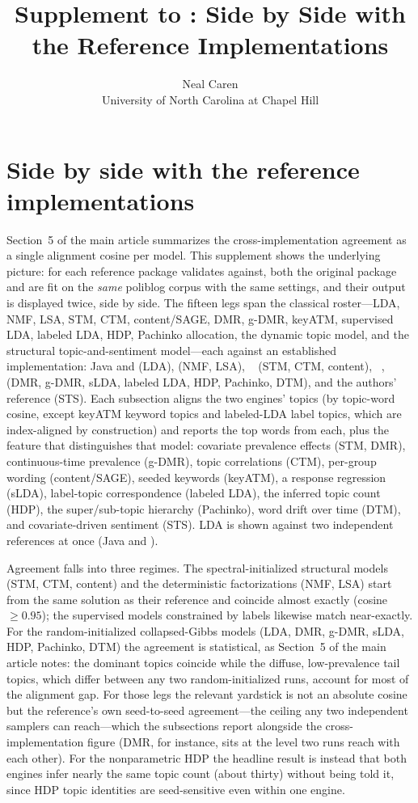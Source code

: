 \documentclass[article,nojss]{jss}
\author{Neal Caren\\University of North Carolina at Chapel Hill}
\title{Supplement to \pkg{topica}: Side by Side with the Reference
Implementations}
\begin{document}
\section{Side by side with the reference implementations}\label{app:sidebyside}

Section~5 of the main article summarizes the cross-implementation agreement as a
single alignment cosine per model. This supplement shows the underlying picture: for
each reference package  validates against, both the original package
and  are fit on the \emph{same} poliblog corpus with the same
settings, and their output is displayed twice, side by side. The fifteen legs span
the classical roster---LDA, NMF, LSA, STM, CTM, content/SAGE, DMR, g-DMR, keyATM,
supervised LDA, labeled LDA, HDP, Pachinko allocation, the dynamic topic model, and
the structural topic-and-sentiment model---each against an established
implementation: Java  and  (LDA),  (NMF,
LSA), ~ (STM, CTM, content), ~,
 (DMR, g-DMR, sLDA, labeled LDA, HDP, Pachinko, DTM), and the authors'
 reference (STS). Each subsection aligns the two engines' topics (by
topic-word cosine, except keyATM keyword topics and labeled-LDA label topics, which
are index-aligned by construction) and reports the top words from each, plus the
feature that distinguishes that model: covariate prevalence effects (STM, DMR),
continuous-time prevalence (g-DMR), topic correlations (CTM), per-group wording
(content/SAGE), seeded keywords (keyATM), a response regression (sLDA), label-topic
correspondence (labeled LDA), the inferred topic count (HDP), the super/sub-topic
hierarchy (Pachinko), word drift over time (DTM), and covariate-driven sentiment
(STS). LDA is shown against two independent references at once (Java 
and ).

Agreement falls into three regimes. The spectral-initialized structural models (STM,
CTM, content) and the deterministic factorizations (NMF, LSA) start from the same
solution as their reference and coincide almost exactly (cosine $\geq 0.95$); the
supervised models constrained by labels likewise match near-exactly. For the
random-initialized collapsed-Gibbs models (LDA, DMR, g-DMR, sLDA, HDP, Pachinko,
DTM) the agreement is statistical, as Section~5 of the main article notes: the
dominant topics coincide while the diffuse, low-prevalence tail topics, which differ
between any two random-initialized runs, account for most of the alignment gap. For
those legs the relevant yardstick is not an absolute cosine but the reference's own
seed-to-seed agreement---the ceiling any two independent samplers can reach---which
the subsections report alongside the cross-implementation figure (DMR, for instance,
sits at the level two  runs reach with each other). For the
nonparametric HDP the headline result is instead that both engines infer nearly the
same topic count (about thirty) without being told it, since HDP topic identities are
seed-sensitive even within one engine.
\end{document}
